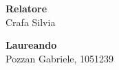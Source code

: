 \documentclass[12pt]{article}
\begin{document}
\begin{titlepage}
\begin{center}
\vspace{30pt}

\begin{large}
\begin{flushleft}
\textbf{Relatore}\\
\vspace{5pt}
Crafa Silvia
\end{flushleft}

\vspace{0pt}

\begin{flushright}
\textbf{Laureando}\\
\vspace{5pt}
Pozzan Gabriele, 1051239
\end{flushright}
\end{large}

\end{center}
\end{titlepage}

\tableofcontents




\end{document}
